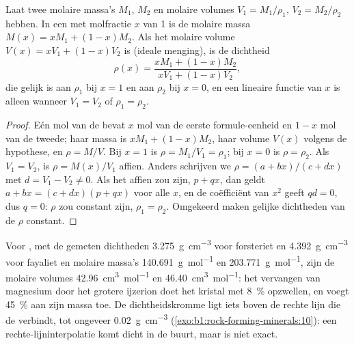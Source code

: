 \begin{proposition}\label{prop:b1:rock-forming-minerals:ideal-mixing}
Laat twee  molaire massa's $M_1$, $M_2$ en molaire volumes $V_1 = M_1/\rho_1$, $V_2 = M_2/\rho_2$ hebben. In een
 met molfractie $x$ van  1 is de molaire massa $M(x) = x M_1 + (1 - x) M_2$. Als het molaire volume
$V(x) = x V_1 + (1 - x) V_2$ is (ideale menging), is de dichtheid
\[
  \rho(x) = \frac{x M_1 + (1 - x) M_2}{x V_1 + (1 - x) V_2},
\]
die gelijk is aan $\rho_1$ bij $x = 1$ en aan $\rho_2$ bij $x = 0$, en een lineaire functie van $x$ is alleen wanneer $V_1 = V_2$
of $\rho_1 = \rho_2$.
\end{proposition}

\begin{proof}
Eén mol van de  bevat $x$ mol van de eerste formule-eenheid en $1 - x$ mol van de tweede; haar massa is
$x M_1 + (1 - x) M_2$, haar volume $V(x)$ volgens de hypothese, en $\rho = M/V$. Bij $x = 1$ is $\rho = M_1/V_1 = \rho_1$;
bij $x = 0$ is $\rho = \rho_2$. Als $V_1 = V_2$, is $\rho = M(x)/V_1$ affien. Anders schrijven we $\rho = (a + bx)/(c + dx)$ met
$d = V_1 - V_2 \ne 0$. Als het affien zou zijn, $p + qx$, dan geldt $a + bx = (c + dx)(p + qx)$ voor alle $x$, en de coëfficiënt
van $x^2$ geeft $qd = 0$, dus $q = 0$: $\rho$ zou constant zijn, $\rho_1 = \rho_2$. Omgekeerd maken gelijke dichtheden van de 
$\rho$ constant.
\end{proof}

Voor , met de gemeten dichtheden \qty{3.275}{g.cm^{-3}} voor forsteriet en \qty{4.392}{g.cm^{-3}} voor fayaliet en
molaire massa's \qty{140.691}{g.mol^{-1}} en \qty{203.771}{g.mol^{-1}}, zijn de molaire volumes \qty{42.96}{cm^3.mol^{-1}} en
\qty{46.40}{cm^3.mol^{-1}}: het vervangen van magnesium door het grotere ijzerion doet het kristal met \qty{8}{\percent} opzwellen, en
voegt \qty{45}{\percent} aan zijn massa toe. De dichtheidskromme ligt iets boven de rechte lijn die de  verbindt, tot ongeveer
\qty{0.02}{g.cm^{-3}} (\cref{exo:b1:rock-forming-minerals:10}): een rechte-lijninterpolatie komt dicht in de buurt, maar is niet exact.

